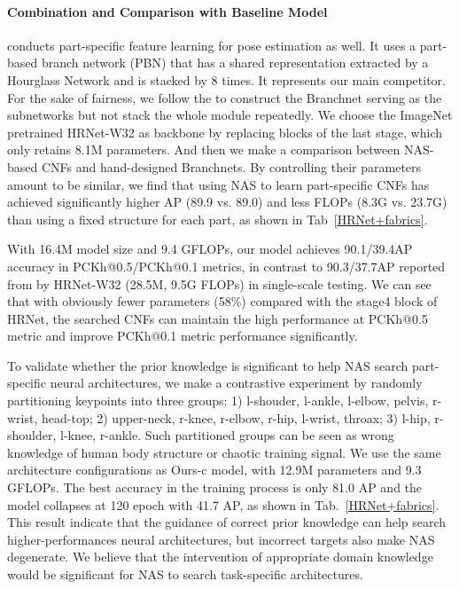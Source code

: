\documentclass[journal]{IEEEtran}
\begin{document}
  \paragraph{Combination and Comparison with Baseline Model}
  \cite{Tang_2019_CVPR} conducts part-specific feature learning for pose estimation as well. It uses a part-based branch network (PBN) that has a shared representation extracted by a Hourglass Network and is stacked by 8 times. It represents our main competitor. For the sake of fairness, we follow the \cite{Tang_2019_CVPR} to construct the Branchnet serving as the subnetworks  but not stack the whole module repeatedly. We choose the ImageNet pretrained HRNet-W32 \cite{Sun_2019_CVPR} as backbone by replacing blocks of the last stage, which only retains 8.1M parameters. And then we make a comparison between NAS-based CNFs and hand-designed Branchnets. By controlling their parameters amount to be similar, we find that using NAS to learn part-specific CNFs has achieved significantly higher AP (89.9 vs. 89.0) and less FLOPs (8.3G vs. 23.7G) than using a fixed structure for each part, as shown in Tab~\ref{HRNet+fabrics}. 
  
  With 16.4M model size and 9.4 GFLOPs, our model achieves 90.1/39.4AP accuracy in PCKh@0.5/PCKh@0.1 metrics, in contrast to 90.3/37.7AP reported from \cite{Sun_2019_CVPR} by HRNet-W32 (28.5M, 9.5G FLOPs) in single-scale testing. We can see that with obviously fewer parameters (58\%) compared with the stage4 block of HRNet, the searched CNFs can maintain the high performance at PCKh@0.5 metric and improve PCKh@0.1 metric performance significantly.
  
  To validate whether the prior knowledge is significant to help NAS search part-specific neural architectures, we make a contrastive experiment by randomly partitioning keypoints into three groups: 1) l-shouder, l-ankle, l-elbow, pelvis, r-wrist, head-top; 2) upper-neck, r-knee, r-elbow, r-hip, l-wrist, throax; 3) l-hip, r-shoulder, l-knee, r-ankle. Such partitioned groups can be seen as wrong knowledge of human body structure or chaotic training signal. We use the same architecture configurations as Ours-c model, with 12.9M parameters and 9.3 GFLOPs. The best accuracy in the training process is only 81.0 AP and the model collapses at 120 epoch with 41.7 AP, as shown in Tab.~\ref{HRNet+fabrics}. This result indicate that the guidance of correct prior knowledge can help search higher-performances neural architectures, but incorrect targets also make NAS degenerate. We believe that the intervention of appropriate domain knowledge would be significant for NAS to search task-specific architectures.
  
\end{document}
